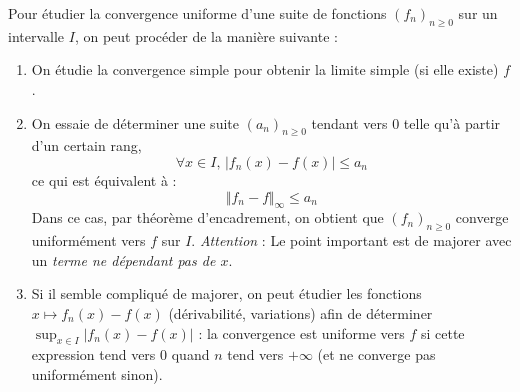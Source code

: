 \documentclass[a4paper,10pt]{report}
\begin{document}
\begin{metho} Pour étudier la convergence uniforme d'une suite de fonctions $(f_n)_{n \geq 0}$  sur un intervalle $I$, on peut procéder de la manière suivante :

\begin{enumerate}
\item On étudie la convergence simple pour obtenir la limite simple (si elle existe) $f$.
\item On essaie de déterminer une suite $(a_n)_{n \geq 0}$ tendant vers $0$ telle qu'à partir d'un certain rang,
$$ \forall x \in I, \, \vert f_n(x)-f(x) \vert \leq a_n$$
ce qui est équivalent à :
$$ \Vert f_n - f \Vert_{\infty} \leq a_n$$
Dans ce cas, par théorème d'encadrement, on obtient que $(f_n)_{n \geq 0}$ converge uniformément vers $f$ sur $I$. \emph{Attention} : Le point important est de majorer avec un \emph{terme ne dépendant pas de $x$}.
\item Si il semble compliqué de majorer, on peut étudier les fonctions $x \mapsto f_n(x)-f(x)$ (dérivabilité, variations) afin de déterminer $\sup_{x \in I} \vert f_n(x)-f(x) \vert$ : la convergence est uniforme vers $f$ si cette expression tend vers $0$ quand $n$ tend vers $+ \infty$ (et ne converge pas uniformément sinon). 
\end{enumerate}
\end{metho}
\end{document}
